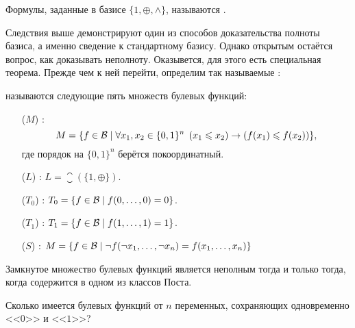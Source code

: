 \begin{definition}
    \label{definition:boolean:Zhegalkin_polynomials}
    Формулы, заданные в базисе $ \{1, \oplus, \wedge \} $, называются .
\end{definition}

Следствия выше демонстрируют один из способов доказательства полноты базиса, а именно сведение к стандартному базису.
Однако открытым остаётся вопрос, как доказывать неполноту.
Оказывется, для этого есть специальная теорема.
Прежде чем к ней перейти, определим так называемые :

\begin{definition}
    \label{definition:boolean:Post_classes}
     называются следующие пять множеств булевых функций:
    \begin{enumerate}
        \item[($ M $)] :
            \[
                M = \{ f \in \mathcal{B} \mid \forall x_1, x_2 \in \{0, 1\}^n \;\, (x_1 \leqslant x_2) \rightarrow (f(x_1) \leqslant f(x_2)) \},
            \]
            где порядок на $ \{0, 1\}^n $ берётся покоординатный.
        \item[($ L $)] : $ L = \closure(\{1, \oplus\}) $.
        \item[($ T_0 $)] : $ T_0 = \{ f \in \mathcal{B} \mid f(0, \ldots, 0) = 0 \} $.
        \item[($ T_1 $)] : $ T_1 = \{ f \in \mathcal{B} \mid f(1, \ldots, 1) = 1 \} $.
        \item[($ S $)] : $ M = \left\{ f \in \mathcal{B} \mid \neg f(\neg x_1, \ldots, \neg x_n) = f(x_1, \ldots, x_n) \right\} $
    \end{enumerate}
\end{definition}

\begin{theorem}[Поста]
    \label{theorem:boolean:Post}
    Замкнутое множество булевых функций является неполным тогда и только тогда, когда содержится в одном из классов Поста.
\end{theorem}


\begin{Exercise}[counter=SecExercise, label={exercise:boolean:preserves_0_1}]
    \noindent
    Сколько имеется булевых функций от $ n $ переменных,
    сохраняющих одновременно <<$ 0 $>> и <<$ 1 $>>?
\end{Exercise}

